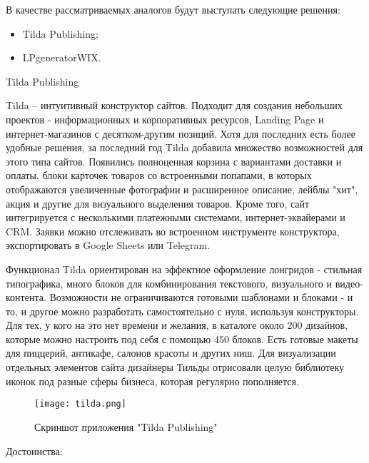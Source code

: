 В качестве рассматриваемых аналогов будут выступать следующие решения:
\begin{itemize}
    \item Tilda Publishing;
    \item LPgeneratorWIX.
\end{itemize}

{Tilda Publishing}

Tilda – интуитивный конструктор сайтов. Подходит для создания небольших проектов - информационных и корпоративных ресурсов, Landing Page и интернет-магазинов с десятком-другим позиций. Хотя для последних есть более удобные решения, за последний год Tilda добавила множество возможностей для этого типа сайтов. Появились полноценная корзина с вариантами доставки и оплаты, блоки карточек товаров со встроенными попапами, в которых отображаются увеличенные фотографии и расширенное описание, лейблы "хит", акция и другие для визуального выделения товаров. Кроме того, сайт интегрируется с несколькими платежными системами, интернет-эквайерами и CRM. Заявки можно отслеживать во встроенном инструменте конструктора, экспортировать в Google Sheets или Telegram.

Функционал Tilda ориентирован на эффектное оформление лонгридов - стильная типографика, много блоков для комбинирования текстового, визуального и видео-контента. Возможности не ограничиваются готовыми шаблонами и блоками - и то, и другое можно разработать самостоятельно с нуля, используя конструкторы. Для тех, у кого на это нет времени и желания, в каталоге около 200 дизайнов, которые можно настроить под себя с помощью 450 блоков. Есть готовые макеты для пиццерий, антикафе, салонов красоты и других ниш. Для визуализации отдельных элементов сайта дизайнеры Тильды отрисовали целую библиотеку иконок под разные сферы бизнеса, которая регулярно пополняется.

\pagebreak

\begin{figure}
\centering
	\texttt{[image: tilda.png]}
	\caption{Скриншот приложения "Tilda Publishing"}
	\label{sec:domain:horse}
\end{figure}

Достоинства:

